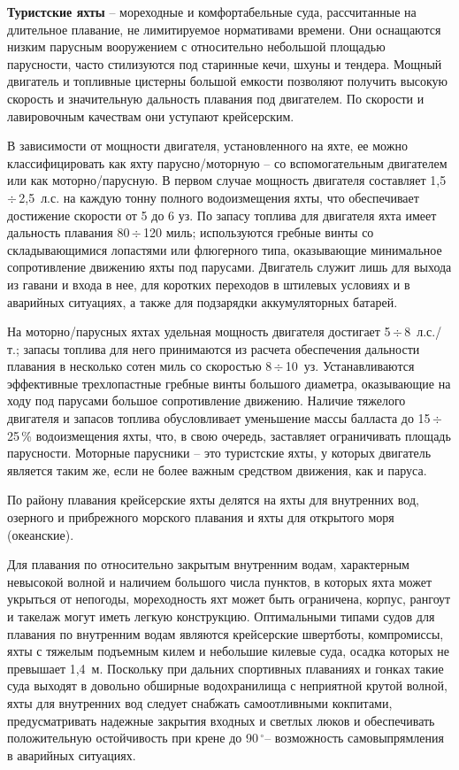 \documentclass[a4paper, 12pt, twoside, final, book, russian, fittopage, cyremdash]{ncc}
\newcommand{\gr}{\ensuremath{\,^\circ}\xspace}
\newcommand{\otdo}{\,\ensuremath{\div}\,}
\begin{document}
\textbf{Туристские яхты} \--- мореходные и комфортабельные суда, рассчитанные на длительное плавание, не лимитируемое нормативами времени. Они оснащаются низким парусным вооружением с относительно небольшой площадью парусности, часто стилизуются под старинные кечи, шхуны и тендера. Мощный двигатель и топливные цистерны большой емкости позволяют получить высокую скорость и значительную дальность плавания под двигателем. По скорости и лавировочным качествам они уступают крейсерским. 

В зависимости от мощности двигателя, установленного на яхте, ее можно классифицировать как яхту парусно\-/моторную \--- со вспомогательным двигателем или как моторно\-/парусную. В первом случае мощность двигателя составляет 1,5\otdo 2,5~л.с. на каждую тонну полного водоизмещения яхты, что обеспечивает достижение скорости от 5 до 6 уз. По запасу топлива для двигателя яхта имеет дальность плавания 80\otdo 120 миль; используются гребные винты со складывающимися лопастями или флюгерного типа, оказывающие минимальное сопротивление движению яхты под парусами. Двигатель служит лишь для выхода из гавани и входа в нее, для коротких переходов в штилевых условиях и в аварийных ситуациях, а также для подзарядки аккумуляторных батарей. 

На моторно\-/парусных яхтах удельная мощность двигателя достигает 5\otdo 8~л.с./т.; запасы топлива для него принимаются из расчета обеспечения дальности плавания в несколько сотен миль со скоростью 8\otdo 10~уз. Устанавливаются эффективные трехлопастные гребные винты большого диаметра, оказывающие на ходу под парусами большое сопротивление движению. Наличие тяжелого двигателя и запасов топлива обусловливает уменьшение массы балласта до 15\otdo 25\,\% водоизмещения яхты, что, в свою очередь, заставляет ограничивать площадь парусности. Моторные парусники \--- это туристские яхты, у которых двигатель является таким же, если не более важным средством движения, как и паруса. 

По району плавания крейсерские яхты делятся на яхты для внутренних вод, озерного и прибрежного морского плавания и яхты для открытого моря (океанские). 

Для плавания по относительно закрытым внутренним водам, характерным невысокой волной и наличием большого числа пунктов, в которых яхта может укрыться от непогоды, мореходность яхт может быть ограничена, корпус, рангоут и такелаж могут иметь легкую конструкцию. Оптимальными типами судов для плавания по внутренним водам являются крейсерские швертботы, компромиссы, яхты с тяжелым подъемным килем и небольшие килевые суда, осадка которых не превышает 1,4~м. Поскольку при дальних спортивных плаваниях и гонках такие суда выходят в довольно обширные водохранилища с неприятной крутой волной, яхты для внутренних вод следует снабжать самоотливными кокпитами, предусматривать надежные закрытия входных и светлых люков и обеспечивать положительную остойчивость при крене до 90\gr \--- возможность самовыпрямления в аварийных ситуациях. 
\end{document}
